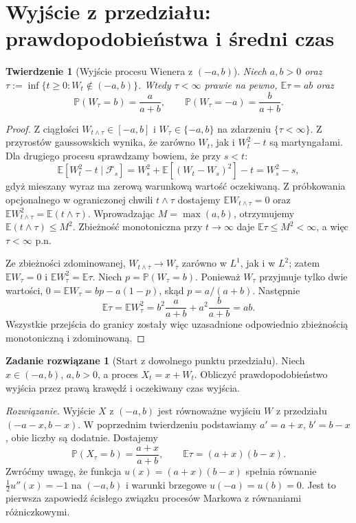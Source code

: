\documentclass[11pt,a4paper,oneside]{report}
\numberwithin{equation}{chapter}
\theoremstyle{plain}
\newtheorem{twierdzenie}{Twierdzenie}[chapter]
\theoremstyle{definition}
\newtheorem{zadanie}{Zadanie rozwiązane}[chapter]
\theoremstyle{remark}
\newcommand{\Prob}{\mathbb{P}}
\newcommand{\E}{\mathbb{E}}
\newcommand{\calF}{\mathcal{F}}
\begin{document}
\section{Wyjście z przedziału: prawdopodobieństwa i średni czas}
\begin{twierdzenie}[Wyjście procesu Wienera z $(-a,b)$]
Niech $a,b>0$ oraz
$\tau:=\inf\{t\ge0:W_t\notin(-a,b)\}$.
Wtedy $\tau<\infty$ prawie na pewno,
$\E\tau=ab$ oraz
\[
\Prob(W_\tau=b)=\frac{a}{a+b},\qquad
\Prob(W_\tau=-a)=\frac{b}{a+b}.
\]
\end{twierdzenie}
\begin{proof}
Z ciągłości $W_{t\wedge\tau}\in[-a,b]$ i
$W_\tau\in\{-a,b\}$ na zdarzeniu $\{\tau<\infty\}$.
Z przyrostów gaussowskich wynika, że zarówno $W_t$,
jak i $W_t^2-t$ są martyngałami. Dla drugiego procesu
sprawdzamy bowiem, że przy $s<t$:
\[
\E[W_t^2-t\mid\calF_s]
=W_s^2+\E[(W_t-W_s)^2]-t=W_s^2-s,
\]
gdyż mieszany wyraz ma zerową warunkową wartość oczekiwaną.
Z próbkowania opcjonalnego w ograniczonej chwili
$t\wedge\tau$ dostajemy
$\E W_{t\wedge\tau}=0$ oraz
$\E W_{t\wedge\tau}^2=\E(t\wedge\tau)$.
Wprowadzając $M=\max(a,b)$, otrzymujemy
$\E(t\wedge\tau)\le M^2$. Zbieżność monotoniczna
przy $t\to\infty$ daje $\E\tau\le M^2<\infty$,
a więc $\tau<\infty$ p.n.

Ze zbieżności zdominowanej,
$W_{t\wedge\tau}\to W_\tau$ zarówno w $L^1$,
jak i w $L^2$; zatem
$\E W_\tau=0$ i
$\E W_\tau^2=\E\tau$.
Niech $p=\Prob(W_\tau=b)$. Ponieważ
$W_\tau$ przyjmuje tylko dwie wartości,
$0=\E W_\tau=bp-a(1-p)$, skąd $p=a/(a+b)$.
Następnie
\[
\E\tau=\E W_\tau^2
=b^2\frac{a}{a+b}+a^2\frac{b}{a+b}=ab.
\]
Wszystkie przejścia do granicy zostały więc uzasadnione
odpowiednio zbieżnością monotoniczną i zdominowaną.
\end{proof}

\begin{zadanie}[Start z dowolnego punktu przedziału]
Niech $x\in(-a,b)$, $a,b>0$, a proces
$X_t=x+W_t$. Obliczyć prawdopodobieństwo wyjścia
przez prawą krawędź i oczekiwany czas wyjścia.

\emph{Rozwiązanie.} Wyjście $X$ z $(-a,b)$ jest
równoważne wyjściu $W$ z przedziału
$(-a-x,b-x)$. W poprzednim twierdzeniu podstawiamy
$a'=a+x$, $b'=b-x$, obie liczby są dodatnie. Dostajemy
\[
\Prob(X_\tau=b)=\frac{a+x}{a+b},\qquad
\E\tau=(a+x)(b-x).
\]
Zwróćmy uwagę, że funkcja $u(x)=(a+x)(b-x)$
spełnia równanie $\frac12u''(x)=-1$ na $(-a,b)$
i warunki brzegowe $u(-a)=u(b)=0$.
Jest to pierwsza zapowiedź ścisłego związku procesów
Markowa z równaniami różniczkowymi.
\end{zadanie}
\end{document}

